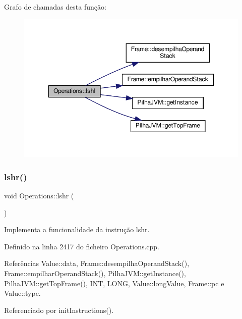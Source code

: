 Grafo de chamadas desta função\+:
\nopagebreak
\begin{figure}[H]
\begin{center}
\leavevmode
\includegraphics[width=350pt]{classOperations_a9d2b2a5ea74f26e6a5005ec9e99b24d9_cgraph}
\end{center}
\end{figure}
\mbox{\label{classOperations_aa886b0d027fb5b030016af6100541e81}} 
\subsubsection{\texorpdfstring{lshr()}{lshr()}}
{\footnotesize\ttfamily void Operations\+::lshr (\begin{DoxyParamCaption}{ }\end{DoxyParamCaption})\hspace{0.3cm}{\ttfamily [private]}}



Implementa a funcionalidade da instrução lshr. 



Definido na linha 2417 do ficheiro Operations.\+cpp.



Referências Value\+::data, Frame\+::desempilha\+Operand\+Stack(), Frame\+::empilhar\+Operand\+Stack(), Pilha\+J\+V\+M\+::get\+Instance(), Pilha\+J\+V\+M\+::get\+Top\+Frame(), I\+NT, L\+O\+NG, Value\+::long\+Value, Frame\+::pc e Value\+::type.



Referenciado por init\+Instructions().

